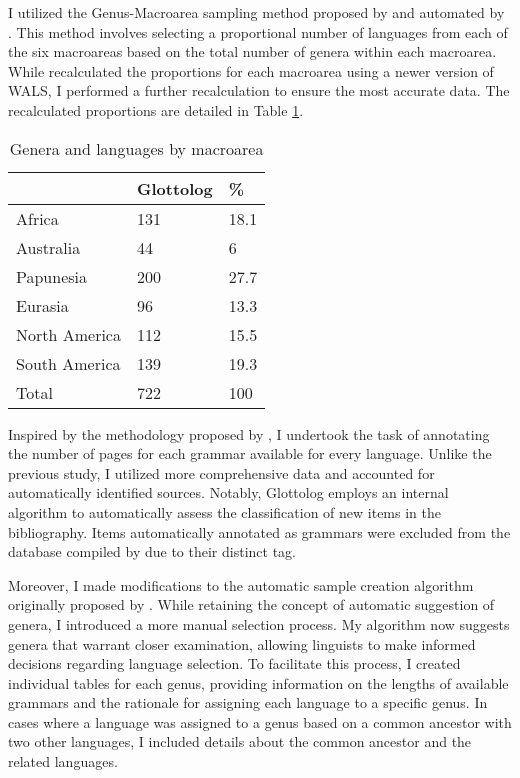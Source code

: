 I utilized the Genus-Macroarea sampling method proposed by \cite{miestamo2016sampling} and automated by \cite{cheveleva2023}. This method involves selecting a proportional number of languages from each of the six macroareas based on the total number of genera within each macroarea. While \cite{cheveleva2023} recalculated the proportions for each macroarea using a newer version of WALS, I performed a further recalculation to ensure the most accurate data. The recalculated proportions are detailed in Table \ref{tab:proportions}.

\begin{table}[h]
	\centering
	\begin{tabular}{@{}lll@{}}
		\toprule
		& Glottolog & \%   \\ \midrule
		Africa        & 131       & 18.1 \\
		Australia     & 44        & 6    \\
		Papunesia     & 200       & 27.7 \\
		Eurasia       & 96        & 13.3 \\
		North America & 112       & 15.5 \\
		South America & 139       & 19.3 \\
		Total         & 722       & 100  \\ \bottomrule
	\end{tabular}
	\caption{Genera and languages by macroarea}\label{tab:proportions}
\end{table}


Inspired by the methodology proposed by \cite{cheveleva2023}, I undertook the task of annotating the number of pages for each grammar available for every language. Unlike the previous study, I utilized more comprehensive data and accounted for automatically identified sources. Notably, Glottolog employs an internal algorithm to automatically assess the classification of new items in the bibliography. Items automatically annotated as grammars were excluded from the database compiled by \cite{cheveleva2023} due to their distinct tag.

Moreover, I made modifications to the automatic sample creation algorithm originally proposed by \cite{cheveleva2023}. While retaining the concept of automatic suggestion of genera, I introduced a more manual selection process. My algorithm now suggests genera that warrant closer examination, allowing linguists to make informed decisions regarding language selection. To facilitate this process, I created individual tables for each genus, providing information on the lengths of available grammars and the rationale for assigning each language to a specific genus. In cases where a language was assigned to a genus based on a common ancestor with two other languages, I included details about the common ancestor and the related languages.

